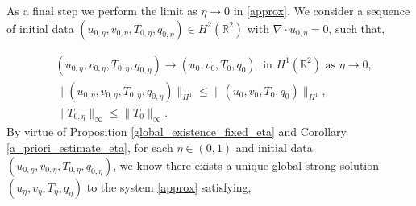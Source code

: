 \documentclass[11pt, a4paper, article,reqno,]{amsart}
\theoremstyle{remark}
\numberwithin{equation}{section}
\begin{document}
As a final step we perform the limit as $\eta \rightarrow 0$ in \eqref{approx}. We consider a sequence of initial data $(u_{0,\eta}, v_{0,\eta}, T_{0,\eta}, q_{0,\eta}) \in H^2(\mathbb{R}^2)$ with $\nabla \cdot u_{0,\eta} = 0$, such that,

\begin{equation*}
    \begin{aligned}
        & (u_{0,\eta},v_{0,\eta}, T_{0,\eta}, q_{0,\eta}) \rightarrow (u_{0},v_{0}, T_{0}, q_{0}) \; \text{ in } H^1(\mathbb{R}^2) \text{ as } \eta \rightarrow 0, \\
        &\|(u_{0,\eta},v_{0,\eta}, T_{0,\eta}, q_{0,\eta})\|_{H^1} \leq \|(u_{0},v_{0}, T_{0}, q_{0})\|_{H^1},\\
        &\|T_{0,\eta}\|_\infty \leq \|T_0\|_\infty.
    \end{aligned}
\end{equation*}
By virtue of Proposition \ref{global_existence_fixed_eta} and Corollary \ref{a_priori_estimate_eta}, for each $\eta \in (0,1)$ and initial data  $(u_{0,\eta}, v_{0,\eta}, T_{0,\eta}, q_{0,\eta})$, we know there exists a unique global strong solution $(u_\eta, v_\eta, T_\eta, q_\eta)$ to the system \eqref{approx} satisfying,
\end{document}
